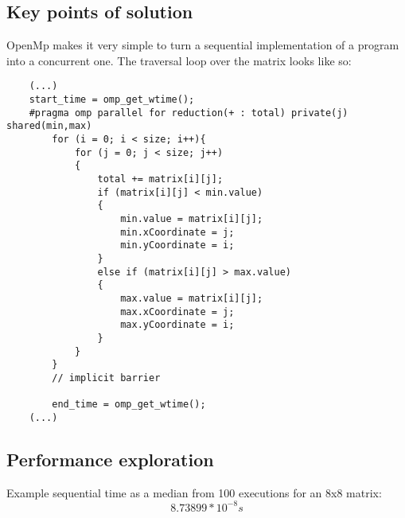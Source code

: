 \documentclass[a4paper,11pt]{article}
\begin{document}
\subsection*{Key points of solution}
OpenMp makes it very simple to turn a sequential implementation of a program into a concurrent one. The traversal loop over the matrix looks like so:

\begin{verbatim}
    (...)
    start_time = omp_get_wtime();
    #pragma omp parallel for reduction(+ : total) private(j) shared(min,max)
        for (i = 0; i < size; i++){
            for (j = 0; j < size; j++)
            {
                total += matrix[i][j];
                if (matrix[i][j] < min.value)
                {
                    min.value = matrix[i][j];
                    min.xCoordinate = j;
                    min.yCoordinate = i;
                }
                else if (matrix[i][j] > max.value)
                {
                    max.value = matrix[i][j];
                    max.xCoordinate = j;
                    max.yCoordinate = i;
                }
            }
        }
        // implicit barrier

        end_time = omp_get_wtime();
    (...)
\end{verbatim}

\subsection*{Performance exploration}

Example sequential time as a median from 100 executions for an 8x8 matrix: \[ 8.73899 * 10^{-8}s\]
\end{document}

